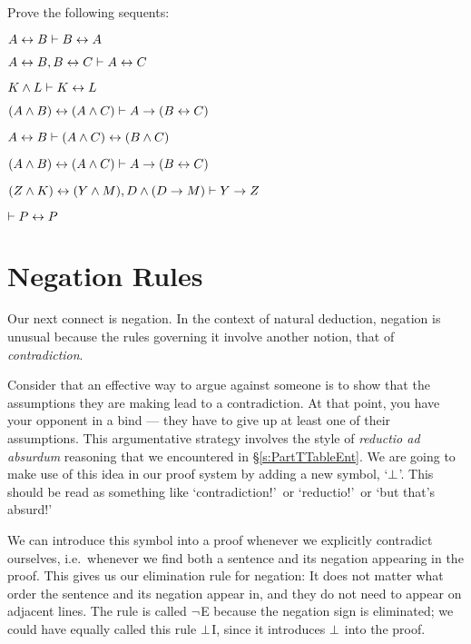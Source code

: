 \practiceproblems

\problempart
Prove the following sequents:

\begin{earg}
\item $A \leftrightarrow B \vdash B \leftrightarrow A$
\item $A\leftrightarrow B, B\leftrightarrow C \vdash A\leftrightarrow C$
\item $K \wedge L \vdash K \leftrightarrow L$
\item $(A \wedge B) \leftrightarrow (A \wedge C) \vdash A \rightarrow (B \leftrightarrow C)$
\item $A \leftrightarrow B \vdash (A \wedge C) \leftrightarrow (B \wedge C)$
\item $(A \wedge B) \leftrightarrow (A \wedge C) \vdash A \rightarrow (B \leftrightarrow C)$
\item $(Z\wedge K)\leftrightarrow(Y\wedge M), D\wedge(D\rightarrow M) \vdash Y\rightarrow Z$
\item $\vdash P \leftrightarrow P$


\end{earg}





\section{Negation Rules}



Our next connect is negation. In the context of natural deduction, negation is unusual because the rules governing it involve another notion, that of  \emph{contradiction}.

Consider that an effective way to argue against someone is to show that the assumptions they are making lead to a contradiction.  At that point, you have your opponent in a bind --- they have to give up at least one of their assumptions. This argumentative strategy involves the style of \emph{reductio ad absurdum} reasoning that we encountered in \S\ref{s:PartTTableEnt}.  We are going to make use of this idea in our proof system by adding a new symbol, `$\bot$'.  This should be read as something like `contradiction!'\ or `reductio!'\ or `but that's absurd!'

We can introduce this symbol into a proof whenever we explicitly contradict ourselves, i.e.\ whenever we find both a sentence and its negation appearing in the proof.  This gives us our elimination rule for negation:
It does not matter what order the sentence and its negation appear in, and they do not need to appear on adjacent lines. The rule is called $\neg$E because the negation sign is eliminated; we could have equally called this rule $\bot$I, since it introduces $\bot$ into the proof.


